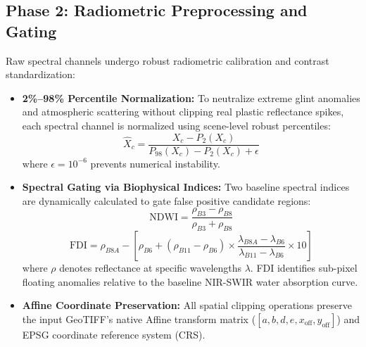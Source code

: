 \documentclass[conference]{IEEEtran}
\begin{document}
\subsection{Phase 2: Radiometric Preprocessing and Gating}
Raw spectral channels undergo robust radiometric calibration and contrast standardization:
\begin{itemize}
    \item \textbf{2\%--98\% Percentile Normalization:} To neutralize extreme glint anomalies and atmospheric scattering without clipping real plastic reflectance spikes, each spectral channel is normalized using scene-level robust percentiles:
    \begin{equation}
        \hat{X}_{c} = \frac{X_{c} - P_{2}(X_{c})}{P_{98}(X_{c}) - P_{2}(X_{c}) + \epsilon}
    \end{equation}
    where $\epsilon = 10^{-6}$ prevents numerical instability.
    \item \textbf{Spectral Gating via Biophysical Indices:} Two baseline spectral indices are dynamically calculated to gate false positive candidate regions:
    \begin{equation}
        \text{NDWI} = \frac{\rho_{B3} - \rho_{B8}}{\rho_{B3} + \rho_{B8}}
    \end{equation}
    \begin{equation}
        \text{FDI} = \rho_{B8A} - \left[ \rho_{B6} + (\rho_{B11} - \rho_{B6}) \times \frac{\lambda_{B8A} - \lambda_{B6}}{\lambda_{B11} - \lambda_{B6}} \times 10 \right]
    \end{equation}
    where $\rho$ denotes reflectance at specific wavelengths $\lambda$. FDI identifies sub-pixel floating anomalies relative to the baseline NIR-SWIR water absorption curve.
    \item \textbf{Affine Coordinate Preservation:} All spatial clipping operations preserve the input GeoTIFF's native Affine transform matrix ($[a, b, d, e, x_{\text{off}}, y_{\text{off}}]$) and EPSG coordinate reference system (CRS).
\end{itemize}
\end{document}
